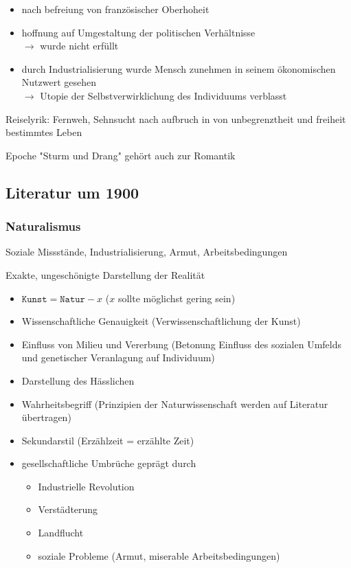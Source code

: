 \begin{itemize}
    \item nach befreiung von französischer Oberhoheit
    \item hoffnung auf Umgestaltung der politischen Verhältnisse \\
        $\rightarrow$ wurde nicht erfüllt
    \item durch Industrialisierung wurde Mensch zunehmen in seinem ökonomischen Nutzwert gesehen \\
        $\rightarrow$ Utopie der Selbstverwirklichung des Individuums verblasst
\end{itemize}

Reiselyrik: Fernweh, Sehnsucht nach aufbruch in von unbegrenztheit und freiheit bestimmtes Leben

Epoche "Sturm und Drang" gehört auch zur Romantik


\subsection{Literatur um 1900}

\subsubsection{Naturalismus}

 Soziale Missstände, Industrialisierung, Armut, Arbeitsbedingungen

 Exakte, ungeschönigte Darstellung der Realität

\begin{itemize}
    \item $\texttt{Kunst} = \texttt{Natur} - x$ ($x$ sollte möglichst gering sein)
    \item Wissenschaftliche Genauigkeit (Verwissenschaftlichung der Kunst)
    \item Einfluss von Milieu und Vererbung (Betonung Einfluss des sozialen Umfelds und genetischer Veranlagung auf Individuum)
    \item Darstellung des Hässlichen
    \item Wahrheitsbegriff (Prinzipien der Naturwissenschaft werden auf Literatur übertragen)
    \item Sekundarstil (Erzählzeit = erzählte Zeit)
\end{itemize}

\begin{itemize}
    \item gesellschaftliche Umbrüche geprägt durch 
    \begin{itemize}
        \item Industrielle Revolution
        \item Verstädterung
        \item Landflucht
        \item soziale Probleme (Armut, miserable Arbeitsbedingungen)
    \end{itemize}
\end{itemize}


